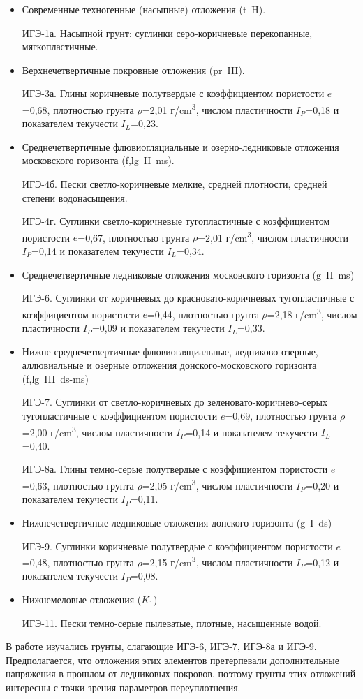 \begin{itemize}
    \item  Современные техногенные (насыпные) отложения (t~H).
    
    ИГЭ-1а. Насыпной грунт: суглинки серо-коричневые перекопанные, мягкопластичные.

    \item Верхнечетвертичные покровные отложения (pr~III).
    
    ИГЭ-3а. Глины коричневые полутвердые с коэффициентом пористости $e$=0,68, 
    плотностью грунта $\rho$=2,01 г/\si{\centi\meter^3}, числом пластичности $I_P$=0,18 и 
    показателем текучести $I_L$=0,23.

    \item Среднечетвертичные флювиогляциальные и озерно-ледниковые отложения московского горизонта (f,lg~II~ms).
    
    ИГЭ-4б. Пески светло-коричневые мелкие, средней плотности, средней степени водонасыщения.

    ИГЭ-4г. Суглинки светло-коричневые тугопластичные с коэффициентом пористости $e$=0,67, 
    плотностью грунта $\rho$=2,01 г/\si{\centi\meter^3}, числом пластичности $I_P$=0,14 и 
    показателем текучести $I_L$=0,34.

    \item Среднечетвертичные ледниковые отложения московского горизонта (g~II~ms)
    
    ИГЭ-6. Суглинки от коричневых до красновато-коричневых тугопластичные с коэффициентом пористости $e$=0,44, 
    плотностью грунта $\rho$=2,18 г/\si{\centi\meter^3}, числом пластичности $I_P$=0,09 и показателем текучести $I_L$=0,33.

    \item Нижне-среднечетвертичные флювиогляциальные, ледниково-озерные, 
    аллювиальные и озерные отложения донского-московского горизонта (f,lg~III~ds-ms)

    ИГЭ-7. Суглинки от светло-коричневых до зеленовато-коричнево-серых тугопластичные с коэффициентом пористости $e$=0,69, 
    плотностью грунта $\rho$=2,00 г/\si{\centi\meter^3}, числом пластичности $I_P$=0,14 и показателем текучести $I_L$=0,40. 

    ИГЭ-8а. Глины темно-серые полутвердые с коэффициентом пористости $e$=0,63, 
    плотностью грунта $\rho$=2,05 г/\si{\centi\meter^3}, числом пластичности $I_P$=0,20 и показателем текучести $I_P$=0,11.

    \item Нижнечетвертичные ледниковые отложения донского горизонта (g~I~ds)
    
    ИГЭ-9. Суглинки коричневые полутвердые с коэффициентом пористости $e$=0,48, 
    плотностью грунта $\rho$=2,15 г/\si{\centi\meter^3}, числом пластичности $I_P$=0,12 и показателем текучести $I_P$=0,08.

    \item Нижнемеловые отложения ({}$K_1${})
    
    ИГЭ-11. Пески темно-серые пылеватые, плотные, насыщенные водой.

\end{itemize}

В работе изучались грунты, слагающие ИГЭ-6, ИГЭ-7, ИГЭ-8а и ИГЭ-9. Предполагается, что отложения 
этих элементов претерпевали дополнительные напряжения в прошлом 
от ледниковых покровов, поэтому грунты этих отложений 
интересны с точки зрения параметров переуплотнения.